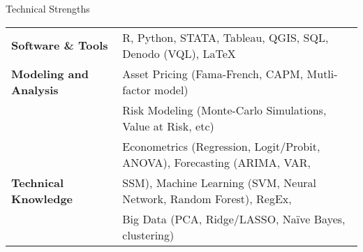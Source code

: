 \documentclass{resume} %
\begin{document}

\begin{rSection}{Technical Strengths}

\begin{tabular}{ @{} >{\bfseries}l @{\hspace{6ex}} l }
Software \& Tools & R, Python, STATA, Tableau, QGIS, SQL, Denodo (VQL), LaTeX\\
Modeling and Analysis \ & Asset Pricing (Fama-French, CAPM, Mutli-factor model)\\
\ & Risk Modeling (Monte-Carlo Simulations, Value at Risk, etc)\\
\ & Econometrics (Regression, Logit/Probit, ANOVA), Forecasting (ARIMA, VAR,\\
Technical Knowledge \ &  SSM), Machine Learning (SVM, Neural Network, Random Forest), RegEx, \\
\ & Big Data (PCA, Ridge/LASSO, Naïve Bayes, clustering)\\
\end{tabular}

\end{rSection}
\end{document}
